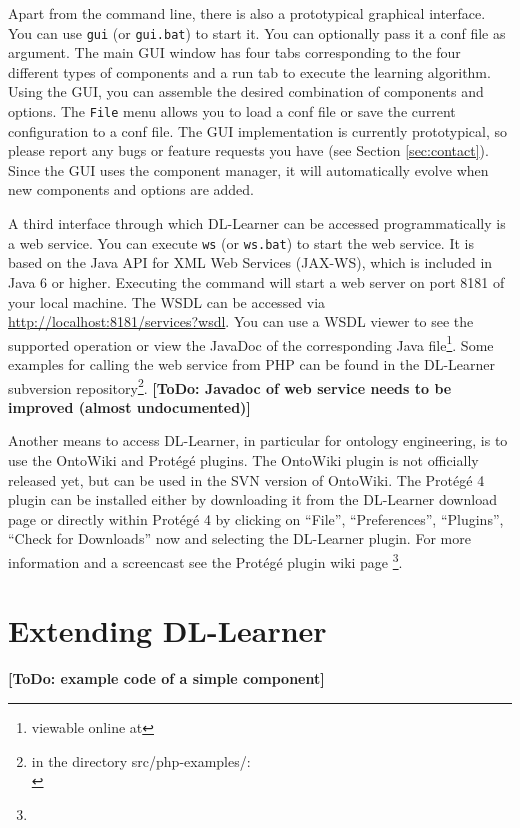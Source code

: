 \documentclass[a4paper,12pt]{scrartcl}
\newcommand{\todo}[1]{\textbf{[ToDo: #1]}}
\begin{document}
Apart from the command line, there is also a prototypical graphical interface. You can use \verb|gui| (or \verb|gui.bat|) to start it. You can optionally pass it a conf file as argument. The main GUI window has four tabs corresponding to the four different types of components and a run tab to execute the learning algorithm. Using the GUI, you can assemble the desired combination of components and options. The \verb|File| menu allows you to load a conf file or save the current configuration to a conf file. The GUI implementation is currently prototypical, so please report any bugs or feature requests you have (see Section \ref{sec:contact}). Since the GUI uses the component manager, it will automatically evolve when new components and options are added.

A third interface through which DL-Learner can be accessed programmatically is a web service. You can execute \verb|ws| (or \verb|ws.bat|) to start the web service. It is based on the Java API for XML Web Services (JAX-WS), which is included in Java 6 or higher. Executing the command will start a web server on port 8181 of your local machine. The WSDL can be accessed via \url{http://localhost:8181/services?wsdl}. You can use a WSDL viewer to see the supported operation 
or view the JavaDoc of the corresponding Java file\footnote{viewable online at \wsjavadoc}. 
Some examples for calling the web service from PHP can be found in the DL-Learner subversion 
repository\footnote{in the directory src/php-examples/:\\ \wsphpexamples}.
\todo{Javadoc of web service needs to be improved (almost undocumented)}

Another means to access DL-Learner, in particular for ontology engineering, is to use the OntoWiki and Protégé plugins. The OntoWiki plugin is not officially released yet, but can be used in the SVN version of OntoWiki. The Protégé 4 plugin can be installed either by downloading it from the DL-Learner download page or directly within Protégé 4 by clicking on ``File'', ``Preferences'', ``Plugins'', ``Check for Downloads'' now and selecting the DL-Learner plugin. For more information and a screencast see the Protégé plugin wiki page \footnote{\wikiprotplugin}.

\section{Extending DL-Learner}
\label{sec:developing}

\todo{example code of a simple component}
\end{document}
